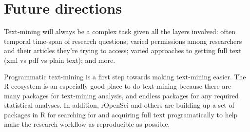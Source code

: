 \documentclass[author-year, review, 11pt]{components/elsarticle} %
\newenvironment{Shaded}{\begin{snugshade}}{\end{snugshade}}
\newcommand{\CommentTok}[1]{\textcolor[rgb]{0.56,0.35,0.01}{\textit{#1}}}
\newcommand{\DataTypeTok}[1]{\textcolor[rgb]{0.13,0.29,0.53}{#1}}
\newcommand{\DecValTok}[1]{\textcolor[rgb]{0.00,0.00,0.81}{#1}}
\newcommand{\KeywordTok}[1]{\textcolor[rgb]{0.13,0.29,0.53}{\textbf{#1}}}
\newcommand{\NormalTok}[1]{#1}
\newcommand{\OperatorTok}[1]{\textcolor[rgb]{0.81,0.36,0.00}{\textbf{#1}}}
\newcommand{\StringTok}[1]{\textcolor[rgb]{0.31,0.60,0.02}{#1}}
\begin{document}
\begin{Shaded}
\end{Shaded}

\hypertarget{future-directions}{%
\section{Future directions}\label{future-directions}}

Text-mining will always be a complex task given all the layers involved:
often temporal time-span of research questions; varied permissions among
researchers and their articles they're trying to access; varied
approaches to getting full text (xml vs pdf vs plain text); and more.

Programmatic text-mining is a first step towards making text-mining
easier. The R ecosystem is an especially good place to do text-mining
because there are many packages for text-mining analysis, and endless
packages for any required statistical analyses. In addition, rOpenSci
and others are building up a set of packages in R for searching for and
acquiring full text programatically to help make the research workflow
as reproducible as possible.
\end{document}

